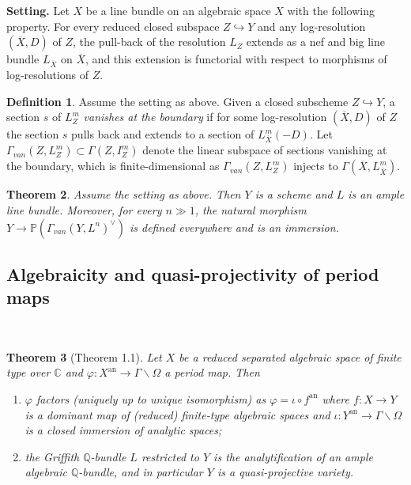 \documentclass{amsart}
\newtheorem{theorem}{Theorem}[subsection]
\theoremstyle{definition}
\newtheorem{definition}[theorem]{Definition}
\numberwithin{equation}{section}
\newcommand{\analytic}{\mathrm{an}}
\begin{document}
{\bfseries\noindent Setting.}
Let $X$ be a line bundle on an algebraic space $X$ with the following property.
For every reduced closed subspace $Z \hookrightarrow Y$
and any log-resolution $(\overline{X},D)$ of $Z$,
the pull-back of the resolution $L_Z$ extends as a nef and big line bundle $L_{\overline{X}}$ on $\overline{X}$,
and this extension is functorial with respect to morphisms of log-resolutions of $Z$.

\begin{definition}
	Assume the setting as above.
	Given a closed subscheme $Z \hookrightarrow Y$,
	a section $s$ of $L^m_Z$ \emph{vanishes at the boundary}
	if for some log-resolution $(\overline{X},D)$ of $Z$
	the section $s$ pulls back and extends to a section of $L^m_{\overline{X}}(-D)$.
	Let $\Gamma_{van}(Z,L^m_Z) \subset \Gamma(Z,I^m_Z)$ denote the linear subspace of sections vanishing at the boundary,
	which is finite-dimensional as $\Gamma_{van}(Z,L^m_Z)$ injects to $\Gamma(\overline{X},L^m_{\overline{X}})$.
\end{definition}

\begin{theorem}
	Assume the setting as above.
	Then $Y$ is a scheme and $L$ is an ample line bundle.
	Moreover, for every $n \gg 1$,
	the natural morphism $Y \to \mathbb{P}(\Gamma_{van}(Y,L^n)^{\vee})$ is defined everywhere and is an immersion.
\end{theorem}

\subsection{Algebraicity and quasi-projectivity of period maps}~

\begin{tcolorbox}[title = {\Large Goal}]
	\begin{theorem}[Theorem 1.1]
		Let $X$ be a reduced separated algebraic space of finite type over $\mathbb{C}$
		and $\varphi: X^\analytic \to \Gamma \backslash \Omega$ a period map. Then
		\begin{enumerate}
			\item
			$\varphi$ factors (uniquely up to unique isomorphism) as
			$\varphi = \iota \circ f^\analytic$
			where $f: X \to Y$ is a dominant map of (reduced) finite-type algebraic spaces
			and $\iota: Y^\analytic \to \Gamma \backslash \Omega$ is a closed immersion of analytic spaces;
			\item
			the Griffith $\mathbb{Q}$-bundle $L$ restricted to $Y$
			is the analytification of an ample algebraic $\mathbb{Q}$-bundle,
			and in particular $Y$ is a quasi-projective variety.
		\end{enumerate}
	\end{theorem}
\end{tcolorbox}
\end{document}
